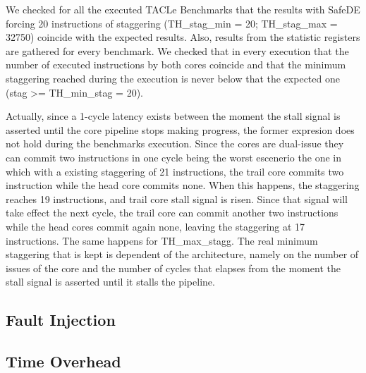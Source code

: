 We checked for all the executed TACLe Benchmarks that the results with SafeDE forcing 20 instructions of staggering (TH\_stag\_min = 20; TH\_stag\_max = 32750) coincide with the expected results. Also, results from the statistic registers are gathered for every benchmark. We checked that in every execution that the number of executed instructions by both cores coincide and that the minimum staggering reached during the execution is never below that the expected one (stag >= TH\_min\_stag = 20). 

Actually, since a 1-cycle latency exists between the moment the stall signal is asserted until the core pipeline stops making progress, the former expresion does not hold during the benchmarks execution. Since the cores are dual-issue they can commit two instructions in one cycle being the worst escenerio the one in which with a existing staggering of 21 instructions, the trail core commits two instruction while the head core commits none. When this happens, the staggering reaches 19 instructions, and trail core stall signal is risen. Since that signal will take effect the next cycle, the trail core can commit another two instructions while the head cores commit again none, leaving the staggering at 17 instructions. The same happens for TH\_max\_stagg. The real minimum staggering that is kept is dependent of the architecture, namely on the number of issues of the core and the number of cycles that elapses from the moment the stall signal is asserted until it stalls the pipeline.  


\subsection{Fault Injection}


\subsection{Time Overhead}



